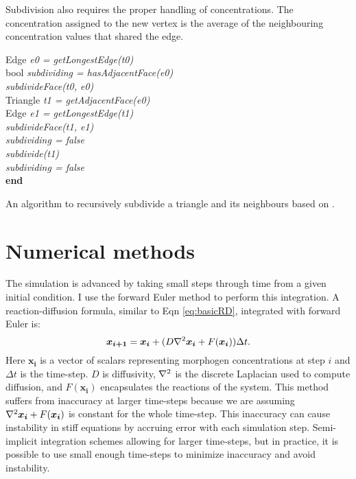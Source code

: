 Subdivision also requires the proper handling of concentrations. The concentration assigned to the new vertex is the average of the neighbouring concentration values that shared the edge.

\begin{algorithm}[!ht]
  {
   Edge \textit{e0 = getLongestEdge(t0)}\\
   bool \textit{subdividing = hasAdjacentFace(e0)}\\
   \textit{subdivideFace(t0, e0)}\\
   {
    {
      Triangle \textit{t1 = getAdjacentFace(e0)}\\
      Edge \textit{e1 = getLongestEdge(t1)}\\
      {
       \textit{subdivideFace(t1, e1)}\\
       \textit{subdividing = false}\\
      }{
        \textit{subdivide(t1)}\\   
      }
    }{
     \textit{subdividing = false}\\
    }
   }
  }
  \textbf{end}
  \caption{An algorithm to recursively subdivide a triangle and its neighbours based on \citep{rivara1998}.}
  \label{alg:subdivisionAlgorithm}
\end{algorithm}

\section{Numerical methods}

The simulation is advanced by taking small steps through time from a given initial condition. I use the forward Euler method \citep{solomon2015} to perform this integration. A reaction-diffusion formula, similar to Eqn \ref{eq:basicRD}, integrated with forward Euler is:
\begin{equation}
	\boldsymbol{x_{i+1}} = \boldsymbol{x_{i}} + (D\nabla^2{}\boldsymbol{x_i} + F(\boldsymbol{x_i}))\Delta t. \\
\end{equation}
Here $\boldsymbol{x_i}$ is a vector of scalars representing morphogen concentrations at step $i$ and $\Delta t$ is the time-step. $D$ is diffusivity, $\nabla^2{}$ is the discrete Laplacian used to compute diffusion, and $F(\boldsymbol{x_i})$ encapsulates the reactions of the system. This method suffers from inaccuracy at larger time-steps because we are assuming $\nabla^2{}\boldsymbol{x_i} + F(\boldsymbol{x_i})$ is constant for the whole time-step. This inaccuracy can cause instability in stiff equations by accruing error with each simulation step. Semi-implicit integration schemes \citep{Nie2006} allowing for larger time-steps, but in practice, it is possible to use small enough time-steps to minimize inaccuracy and avoid instability. 



